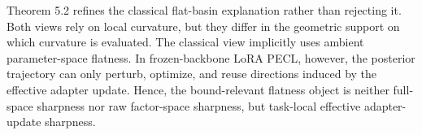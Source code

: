 \documentclass{article}
\begin{document}
Theorem 5.2 refines the classical flat-basin explanation rather than rejecting it. Both views rely on local curvature, but they differ in the geometric support on which curvature is evaluated. The classical view implicitly uses ambient parameter-space flatness. In frozen-backbone LoRA PECL, however, the posterior trajectory can only perturb, optimize, and reuse directions induced by the effective adapter update. Hence, the bound-relevant flatness object is neither full-space sharpness nor raw factor-space sharpness, but task-local effective adapter-update sharpness.










\end{document}

